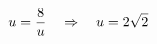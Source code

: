 \documentclass[preview]{standalone}
\begin{document}
\begin{align*}
\special{dvisvgm:raw <g id='unique000'>}u=\frac{8}{u}\quad\Rightarrow\quad u=2\sqrt2\special{dvisvgm:raw </g>}
\end{align*}
\end{document}
